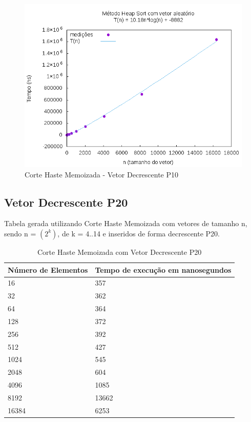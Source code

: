 \documentclass[12pt,a4paper,twoside]{report}
\begin{document}
\begin{figure}[H]
    \centering
    \includegraphics[width=0.7\linewidth]{graficos/HeapSort/vIntAleatorio/vIntAleatorio.png}
  \caption{Corte Haste Memoizada - Vetor Decrescente P10}
\end{figure}

\subsection{Vetor Decrescente P20}
Tabela gerada utilizando Corte Haste Memoizada com vetores de tamanho n, sendo n = $(2^k)$, de k = 4..14 e inseridos de forma decrescente P20.
\begin{table}[H]
\centering
\caption{Corte Haste Memoizada com Vetor Decrescente P20}
\label{my-label}
\begin{tabular}{|l|l|}
\hline
\multicolumn{1}{|c|}{\textbf{Número de Elementos}} & \multicolumn{1}{c|}{\textbf{Tempo de execução em nanosegundos}} \\ \hline
16 & 357 \\ \hline
32 & 362 \\ \hline
64 & 364 \\ \hline
128 & 372 \\ \hline
256 & 392 \\ \hline
512 & 427 \\ \hline
1024 & 545 \\ \hline
2048 & 604 \\ \hline
4096 & 1085 \\ \hline
8192 & 13662 \\ \hline
16384 & 6253 \\ \hline
\end{tabular}
\end{table}
\end{document}
